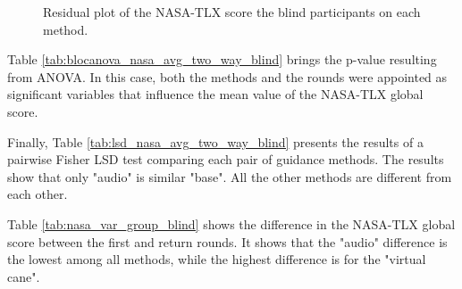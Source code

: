 \begin{figure}[!htb]
\begin{minipage}{0.45\textwidth}
        \caption{Residual plot of the NASA-TLX score the blind participants on each method.}
        \label{fig:residplot_nasa_avg_two_way_blind}
    \end{minipage}
\end{figure}

Table \ref{tab:blocanova_nasa_avg_two_way_blind} brings the p-value resulting from ANOVA. In this case, both the methods and the rounds were appointed as significant variables that influence the mean value of the NASA-TLX global score. 



Finally, Table \ref{tab:lsd_nasa_avg_two_way_blind} presents the results of a pairwise Fisher LSD test comparing each pair of guidance methods. The results show that only "audio" is similar "base". All the other methods are different from each other.



Table \ref{tab:nasa_var_group_blind} shows the difference in the NASA-TLX global score between the first and return rounds. It shows that the "audio" difference is the lowest among all methods, while the highest difference is for the "virtual cane".



\FloatBarrier